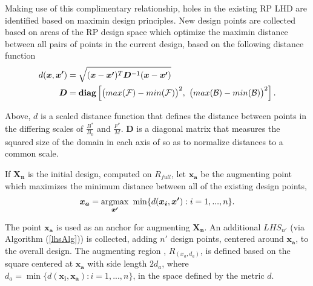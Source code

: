 Making use of this complimentary relationship, holes in the existing RP LHD %
are identified based on maximin design principles.
New design points are collected based on areas of the RP design
space which optimize the maximin distance %
between all pairs of points in the
{current design, based on the following distance function}
\begin{align}
d(\bm{x}, \bm{x'}) &= \sqrt{(\bm{x}-\bm{x'})^T\bm{D}^{-1}(\bm{x}-\bm{x'})}\\
\bm{D} &= \bm{\mbox{diag}\left[} \big(max(\mathcal{F})-min(\mathcal{F})\big)^2, ~\big(max(\mathcal{B})-min(\mathcal{B})\big)^2 \bm{\right]}. \nonumber
\end{align}

%
Above, $d$ is a scaled distance function that defines the distance between
points in the differing scales of $\frac{B^*}{B_0}$ and $\frac{F^*}{M}$.
$\bm{D}$ is a diagonal matrix that measures the squared size of the domain in each 
axis of so as to normalize distances to a common scale.

%
If $\bm{X_n}$ is the initial design, computed on $R_{full}$, let $\bm{x_a}$ be the 
augmenting point which maximizes the minimum distance between all of the existing
design points,
%
\begin{align}
        \bm{x_a} = \argmax_{\bm{x'}} ~\min\{ d(\bm{x_i}, \bm{x'}): i=1,...,n \}.
\end{align}
%

%
The point $\bm{x_a}$ is used as an anchor for augmenting $\bm{X_n}$. %
An additional $LHS_{n'}$ (via Algorithm (\ref{lhsAlg})) is collected, adding
$n'$ design points, centered around $\bm{x_a}$, to the overall design. %
The augmenting region %
, $R_{(x_a, d_a)}$, is defined
based on the square centered at $\bm{x_a}$ with side length $2d_a$, where
\mbox{$d_a = \min\{ d(\bm{x_i}, \bm{x_a}): i=1,...,n \}$}, in the space defined
by the metric $d$.
%

